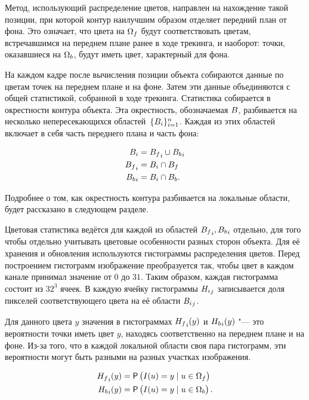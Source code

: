 Метод, использующий распределение цветов, направлен на нахождение такой
позиции, при которой контур наилучшим образом отделяет передний план от фона.
Это означает, что цвета на $\Omega_f$ будут соответствовать цветам,
встречавшимся на переднем плане ранее в ходе трекинга, и наоборот: точки,
оказавшиеся на $\Omega_b$, будут иметь цвет, характерный для фона.

На каждом кадре после вычисления позиции объекта собираются данные по цветам
точек на переднем плане и на фоне.
Затем эти данные объединяются с общей статистикой, собранной в ходе трекинга. 
Статистика собирается в окрестности контура объекта.
Эта окрестность, обозначаемая $B$, разбивается на несколько
непересекающихся областей~$\{B_i\}_{i = 1}^n$.
Каждая из этих областей включает в себя часть переднего плана и часть фона:

\begin{align}
\label{eqn:histo_partitioning}
B_i &= {B_f}_i \cup {\ensuremath{B_b}}_i \\
{B_f}_i &= B_i \cap B_f \\
{B_b}_i &= B_i \cap B_b
\text{.}
\end{align}

Подробнее о том, как окрестность контура разбивается на локальные области,
будет
рассказано в следующем разделе.

Цветовая статистика ведётся для каждой из областей ${B_f}_i,
{B_b}_i$ отдельно, для того чтобы отдельно учитывать цветовые
особенности разных сторон объекта.
Для её хранения и обновления используются гистограммы распределения цветов.
Перед построением гистограмм изображение преобразуется так, чтобы цвет в каждом
канале принимал значение от $0$ до $31$.
Таким образом, каждая гистограмма состоит из $32^3$ ячеек.
В каждую ячейку гистограммы ${H_i}_j$ записывается доля пикселей
соответствующего
цвета на её области ${B_i}_j$.

Для данного цвета $y$ значения в гистограммах ${H_f}_i(y)$ и
${H_b}_i(y)$ "--- это вероятности точки иметь цвет $y$, находясь
соответственно на переднем плане и на фоне.
Из-за того, что в каждой локальной области своя пара гистограмм, эти
вероятности могут быть разными на разных участках изображения.

\begin{align}
\label{eqn:H_f_Y}
    {\ensuremath{H_f}}_i(y) &= \mathsf{P} \left( I(\mathnormal{u}) = y \mid \mathnormal{u} \in \Omega_f \right) \\
    {H_b}_i(y) &= \mathsf{P} \left( I(\mathnormal{u}) = y \mid \mathnormal{u} \in \Omega_b \right)
\text{.}
\end{align}

